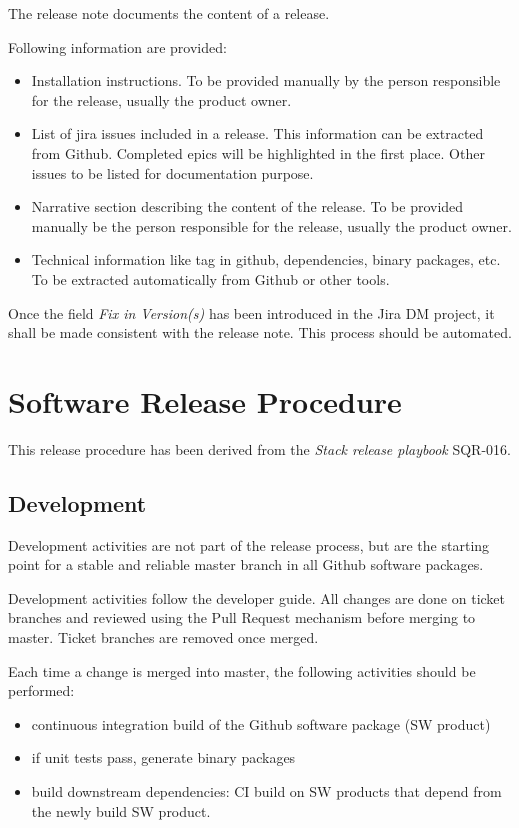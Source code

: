 The release note documents the content of a release.

Following information are provided:
\begin{itemize}
\item Installation instructions. To be provided manually by the person responsible for the release, usually the product owner.
\item List of jira issues included in a release. This information can be extracted from Github. Completed epics will be highlighted in the first place. Other issues to be listed for documentation purpose. 
\item Narrative section describing the content of the release. To be provided manually be the person responsible for the release, usually the product owner.
\item Technical information like tag in github, dependencies, binary packages, etc. To be extracted automatically from Github or other tools.
\end{itemize}

Once the field \textit{Fix in Version(s)} has been introduced in the Jira DM project, it shall be made consistent with the release note. This process should be automated.


\newpage
\section{Software Release Procedure} \label{sect:releaseprocedure}

This release procedure has been derived from the \textit{Stack release playbook} SQR-016.

\subsection{Development} \label{sect:dev}

Development activities are not part of the release process, but are the starting point for a stable and reliable master branch in all Github software packages.

Development activities follow the \citep{DevGuide} developer guide. All changes are done on ticket branches and reviewed using the Pull Request mechanism before merging to master.
Ticket branches are removed once merged.

Each time a change is merged into master, the following activities should be performed:

\begin{itemize}
\item continuous integration build of the Github software package (SW product)
\item if unit tests pass, generate binary packages
\item build downstream dependencies: CI build on SW products that depend from the newly build SW product.
\end{itemize}

